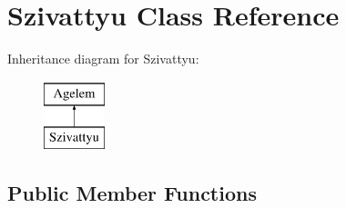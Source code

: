 \hypertarget{class_szivattyu}{}\section{Szivattyu Class Reference}
\label{class_szivattyu}
Inheritance diagram for Szivattyu\+:\begin{figure}[H]
\begin{center}
\leavevmode
\includegraphics[height=2.000000cm]{class_szivattyu}
\end{center}
\end{figure}
\subsection*{Public Member Functions}
